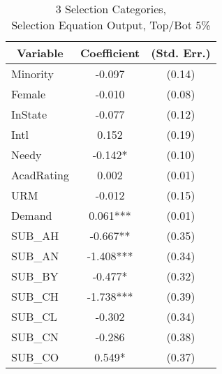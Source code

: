 \clearpage{}

\newpage{}

\begin{table}[htb]\centering
  \begin{threeparttable}
    \caption{3 Selection Categories, \\Selection Equation Output, Top/Bot 5\%}\label{table:b8}
    \begin{tabular}{l c c}
      \hline\hline 
      \multicolumn{1}{c}{\textbf{Variable}} & {\textbf{Coefficient}} & \textbf{(Std. Err.)} \\ 
      \hline
      \hline 
      Minority                              & -0.097                 & (0.14)               \\
      Female                                & -0.010                 & (0.08)               \\
      InState                                    & -0.077                 & (0.12)               \\
      Intl                                  & 0.152                  & (0.19)               \\
      Needy                                 & -0.142*                & (0.10)               \\
      AcadRating                            & 0.002                  & (0.01)               \\
      URM                                   & -0.012                 & (0.15)               \\
      Demand                                & 0.061***               & (0.01)               \\
      SUB\_AH                               & -0.667**               & (0.35)               \\
      SUB\_AN                               & -1.408***              & (0.34)               \\
      SUB\_BY                               & -0.477*                & (0.32)               \\
      SUB\_CH                               & -1.738***              & (0.39)               \\
      SUB\_CL                               & -0.302                 & (0.34)               \\
      SUB\_CN                               & -0.286                 & (0.38)               \\
      SUB\_CO                               & 0.549*                 & (0.37)               \\

\end{tabular}
\end{threeparttable}
\end{table}
